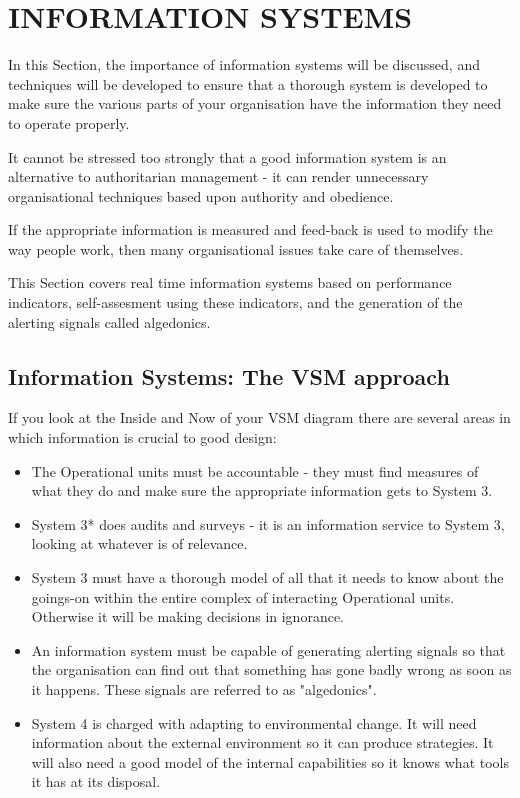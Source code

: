 \chapter{INFORMATION SYSTEMS}
  \label{INFORMATION SYSTEMS}
In this Section, the importance of information systems will be discussed, and techniques will be developed to ensure that a thorough system is developed to make sure the various parts of your organisation have the information they need to operate properly.

It cannot be stressed too strongly that a good information system is an alternative to authoritarian management - it can render unnecessary organisational techniques based upon authority and obedience.

If the appropriate information is measured and feed-back is used to modify the way people work, then many organisational issues take care of themselves.

This Section covers real time information systems based on performance indicators, self-assesment using these indicators, and the generation of the alerting signals called algedonics.

\section*{Information Systems: The VSM approach}
If you look at the Inside and Now of your VSM diagram there are several areas in which information is crucial to good design:

\begin{itemize}
  \item The Operational units must be accountable - they must find measures of what they do and make sure the appropriate information gets to System 3.

  \item System 3* does audits and surveys - it is an information service to System 3, looking at whatever is of relevance.

  \item System 3 must have a thorough model of all that it needs to know about the goings-on within the entire complex of interacting Operational units. Otherwise it will be making decisions in ignorance.

  \item An information system must be capable of generating alerting signals so that the organisation can find out that something has gone badly wrong as soon as it happens. These signals are referred to as "algedonics".

  \item System 4 is charged with adapting to environmental change. It will need information about the external environment so it can produce strategies. It will also need a good model of the internal capabilities so it knows what tools it has at its disposal.

\end{itemize}

